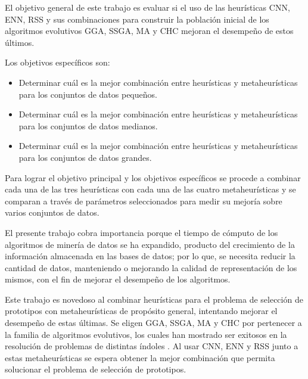 
El objetivo general de este trabajo es evaluar si el uso de las heurísticas CNN, ENN, RSS y sus combinaciones para construir la población inicial de los algoritmos evolutivos GGA, SSGA, MA y CHC  mejoran el desempeño de estos últimos. 

Los objetivos específicos son:

\begin{itemize}

\item Determinar cuál es la mejor combinación entre heurísticas y metaheurísticas para los conjuntos de datos pequeños.

\item Determinar cuál es la mejor combinación entre heurísticas y metaheurísticas para los conjuntos de datos medianos.

\item Determinar cuál es la mejor combinación entre heurísticas y metaheurísticas para los conjuntos de datos grandes.

\end{itemize}

Para lograr el objetivo principal y los objetivos específicos se procede a combinar cada una de las tres heurísticas con cada una de las cuatro metaheurísticas y se comparan a través de parámetros seleccionados para medir su mejoría sobre varios conjuntos de datos. 

El presente trabajo cobra importancia porque el tiempo de cómputo de los algoritmos de minería de datos se ha expandido, producto del crecimiento de la información almacenada en las bases de datos; por lo que, se necesita reducir la cantidad de datos, manteniendo o mejorando la calidad de representación de los mismos, con el fin de mejorar el desempeño de los algoritmos.

Este trabajo es novedoso al combinar heurísticas para el problema de selección de prototipos con metaheurísticas de propósito general, intentando mejorar el desempeño de estas últimas. Se eligen GGA, SSGA, MA y CHC por pertenecer a la familia de algoritmos evolutivos, los cuales han mostrado ser exitosos en la resolución de problemas de distintas índoles \cite{han2011data}. Al usar CNN, ENN y RSS junto a estas metaheurísticas se espera obtener la mejor combinación que permita solucionar el problema de selección de prototipos.

